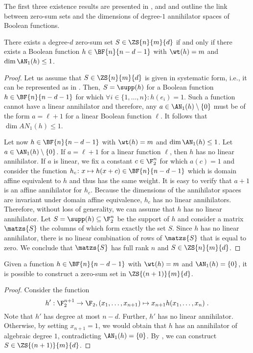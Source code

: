 The first three existence results are presented in ,  and  and outline the link between zero-sum sets and the dimensions of degree-$1$ annihilator spaces of Boolean functions. 
\begin{proposition}
There exists a degree-$d$ zero-sum set $S \in \ZS{n}{m}{d}$ if and only if there exists a Boolean function $h \in \BF{n}{n-d-1}$ with $\wt(h) = m$ and $\dim \AN_1(h) \leq 1$. 
\end{proposition}
\begin{proof}
Let us assume that $S \in \ZS{n}{m}{d}$ is given in systematic form, i.e., it can be represented as in . Then, $S = \supp(h)$ for a Boolean function $h \in \BF{n}{n-d-1}$ for which $\forall i\in \{1,\dots,n\}: h(e_i) = 1$. Such a function cannot have a linear annihilator and therefore, any $a \in \AN_1(h) \setminus \{0\}$ must be of the form $a = \ell+1$ for a linear Boolean function $\ell$. It follows that $\dim AN_1(h) \leq 1$.

Let now $h \in \BF{n}{n-d-1}$ with $\wt(h) = m$ and $\dim \AN_1(h) \leq 1$. Let $a \in \AN_1(h) \setminus \{0\}$. If $a = \ell + 1$ for a linear function $\ell$, then $h$ has no linear annihilator. If $a$ is linear, we fix a constant $c \in \F_2^n$ for which $a(c)=1$ and consider the function $h_c\colon x \mapsto h(x+c) \in \BF{n}{n-d-1}$ which is domain affine equivalent to $h$ and thus has the same weight. It is easy to verify that $a+1$ is an affine annihilator for $h_c$. Because the dimensions of the annihilator spaces are invariant under domain affine equivalence, $h_c$ has no linear annihilators. Therefore, without loss of generality, we can assume that $h$ has no linear annihilator. Let $S = \supp(h) \subseteq \F_2^n$ be the support of $h$ and consider a matrix $\matzs{S}$ the columns of which form exactly the set $S$. Since $h$ has no linear annihilator, there is no linear combination of rows of $\matzs{S}$ that is equal to zero. We conclude that $\matzs{S}$ has full rank $n$ and $S\in \ZS{n}{m}{d}$.
\end{proof}

\begin{proposition}
Given a function $h \in \BF{n}{n-d-1}$ with $\wt(h) = m$ and $\AN_1(h) = \{0\}$, it is possible to construct a zero-sum set in $\ZS{(n+1)}{m}{d}$.
\end{proposition}
\begin{proof}
Consider the function \[h': \F_2^{n+1} \to \F_2, (x_1, \ldots, x_{n+1}) \mapsto x_{n+1} h(x_1, \ldots, x_n)\;.\] Note that $h'$ has degree at most $n-d$. Further, $h'$ has no linear annihilator. Otherwise, by setting $x_{n+1} = 1$, we would obtain that $h$ has an annihilator of algebraic degree $1$, contradicting $\AN_1(h) = \{0\}$. By , we can construct $S \in \ZS{(n+1)}{m}{d}$.
\end{proof}

